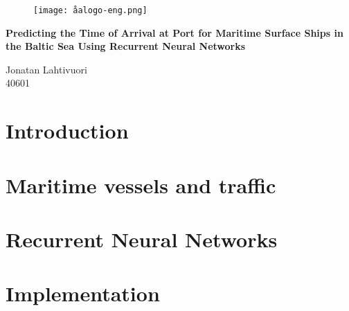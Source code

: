 \documentclass[12pt]{article}
\begin{document}
\begin{titlepage}
\vspace*{20mm}
\begin{figure}[h]
\centering
\texttt{[image: åalogo-eng.png]}
\end{figure}
\begin{center}
	\Huge\textbf{Predicting the Time of Arrival at Port for Maritime Surface Ships in the Baltic Sea Using Recurrent Neural Networks}
\end{center}
\vfill
\begin{flushright}
Jonatan Lahtivuori\\
40601
\end{flushright}
\end{titlepage}




\newpage
\tableofcontents

\newpage
{} %
\section{Introduction}


\newpage
\section{Maritime vessels and traffic}


\newpage
\section{Recurrent Neural Networks}


\newpage
\section{Implementation}

\end{document}
